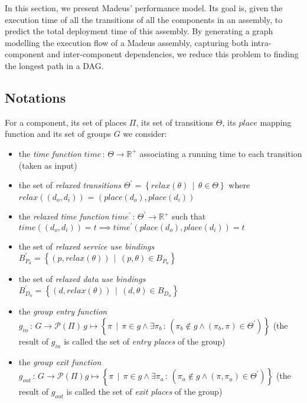 In this section, we present Madeus' performance model. Its goal is,
given the execution time of all the transitions of all the components
in an assembly, to predict the total deployment time of this assembly.
By generating a graph modelling the execution flow of a Madeus assembly,
capturing both intra-component and inter-component dependencies, we
reduce this problem to finding the longest path in a DAG.

\subsection{Notations}

For a component, its set of places $\Pi$, its set of transitions
$\Theta$, its $place$ mapping function and its set of groups $G$
we consider:
\begin{itemize}
\item the \emph{time function} $time\,:\,\Theta\rightarrow\mathbb{R}^{+}$
associating a running time to each transition (taken as input)
\item the set of \emph{relaxed transitions $\Theta^{\prime}=\left\{ relax\left(\theta\right)\,\mid\,\theta\in\Theta\right\} $
}where $relax\left(\left(d_{o},d_{i}\right)\right)$ = $\left(place\left(d_{o}\right),place\left(d_{i}\right)\right)$
\item the \emph{relaxed time function} $time^{\prime}\,:\,\Theta^{\prime}\rightarrow\mathbb{R}^{+}$
such that $time\left(\left(d_{o},d_{i}\right)\right)=t\implies time^{\prime}\left(place\left(d_{o}\right),place\left(d_{i}\right)\right)=t$
\item the set of\emph{ relaxed service use bindings} $B_{P_{u}}^{\prime}=\left\{ \left(p,relax\left(\theta\right)\right)\,\mid\,\left(p,\theta\right)\in B_{P_{u}}\right\} $
\item the set of \emph{relaxed data use bindings} $B_{D_{u}}^{\prime}=\left\{ \left(d,relax\left(\theta\right)\right)\,\mid\,\left(d,\theta\right)\in B_{D_{u}}\right\} $
\item the \emph{group entry function} $g_{in}\,:\,G\rightarrow\mathcal{P}\left(\Pi\right)\,g\mapsto\left\{ \pi\,\mid\,\pi\in g\land\exists\pi_{b}\,:\,\left(\pi_{b}\not\in g\land\left(\pi_{b},\pi\right)\in\Theta^{\prime}\right)\right\} $
(the result of $g_{in}$ is called the set of \emph{entry places}
of the group)
\item the \emph{group exit function} $g_{out}\,:\,G\rightarrow\mathcal{P}\left(\Pi\right)g\mapsto\left\{ \pi\,\mid\,\pi\in g\land\exists\pi_{a}\,:\,\left(\pi_{a}\not\in g\land\left(\pi,\pi_{a}\right)\in\Theta^{\prime}\right)\right\} $
(the result of $g_{out}$ is called the set of \emph{exit places}
of the group)
\end{itemize}
